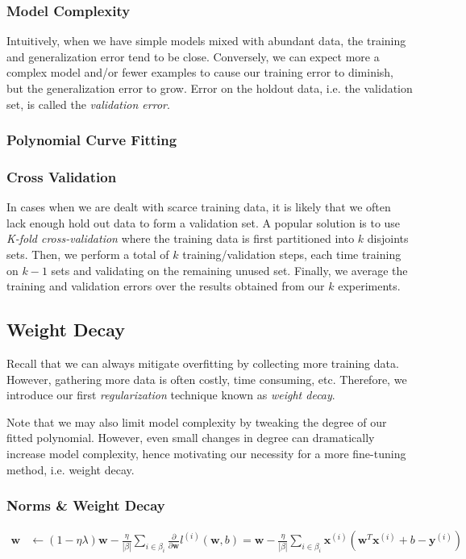 \documentclass[a4paper,12pt]{article}
\theoremstyle{definition}
\begin{document}
    \subsubsection*{Model Complexity}
    Intuitively, when we have simple models mixed with abundant data, the training and generalization error tend to be close.
    Conversely, we can expect more a complex model and/or fewer examples to cause our training error to diminish, but the
    generalization error to grow. Error on the holdout data, i.e. the validation set, is called the \textit{validation error}.
    
    \subsubsection*{Polynomial Curve Fitting}
    \subsubsection*{Cross Validation}
    In cases when we are dealt with scarce training data, it is likely that we often lack enough hold out data to form a validation
    set. A popular solution is to use \textit{K-fold cross-validation} where the training data is first partitioned into $k$ disjoints 
    sets. Then, we perform a total of $k$ training/validation steps, each time training on $k-1$ sets and validating on the remaining unused set.
    Finally, we average the training and validation errors over the results obtained from our $k$ experiments.
    \subsection*{Weight Decay}
    Recall that we can always mitigate overfitting by collecting more training data. However, gathering more data is often costly, time consuming,
    etc. Therefore, we introduce our first \textit{regularization} technique known as \textit{weight decay}.
    
    Note that we may also limit model complexity by tweaking the degree of our fitted polynomial. However, even small
    changes in degree can dramatically increase model complexity, hence motivating our necessity for a more fine-tuning method, i.e. weight decay.

    \subsubsection*{Norms \& Weight Decay}
    \begin{equation*}
        \begin{aligned}
            \mathbf{w}     &\leftarrow (1-\eta\lambda)\mathbf{w} - \frac{\eta}{|\beta|}\sum_{i\in\beta_i}\frac{\partial}{\partial\mathbf{w}}l^{(i)}(\mathbf{w},b) = \mathbf{w}- \frac{\eta}{|\beta|}\sum_{i\in\beta_i}\mathbf{x}^{(i)}(\mathbf{w}^T\mathbf{x}^{(i)} + b - \mathbf{y}^{(i)}) \\
        \end{aligned}
    \end{equation*}
\end{document}
